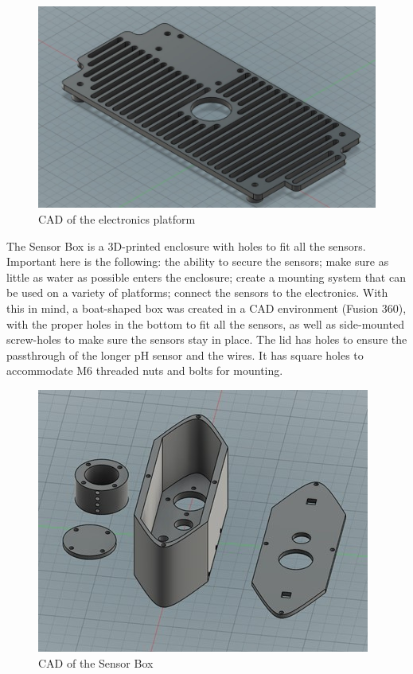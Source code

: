 \documentclass[
  english,
  man,floatsintext]{apa6}
\begin{document}
\begin{figure}[!h]
\includegraphics[width=\textwidth,]{sup/platform_cad} \caption{CAD of the electronics platform}\label{fig:platform-cad}
\end{figure}



The Sensor Box is a 3D-printed enclosure with holes to fit all the sensors. Important here is the following: the ability to secure the sensors; make sure as little as water as possible enters the enclosure; create a mounting system that can be used on a variety of platforms; connect the sensors to the electronics. With this in mind, a boat-shaped box was created in a CAD environment (Fusion 360), with the proper holes in the bottom to fit all the sensors, as well as side-mounted screw-holes to make sure the sensors stay in place. The lid has holes to ensure the passthrough of the longer pH sensor and the wires. It has square holes to accommodate M6 threaded nuts and bolts for mounting.

\begin{figure}[!h]
\includegraphics[width=\textwidth,]{sup/sensor_box_cad} \caption{CAD of the Sensor Box}\label{fig:sensor-box-cad}
\end{figure}
\end{document}
